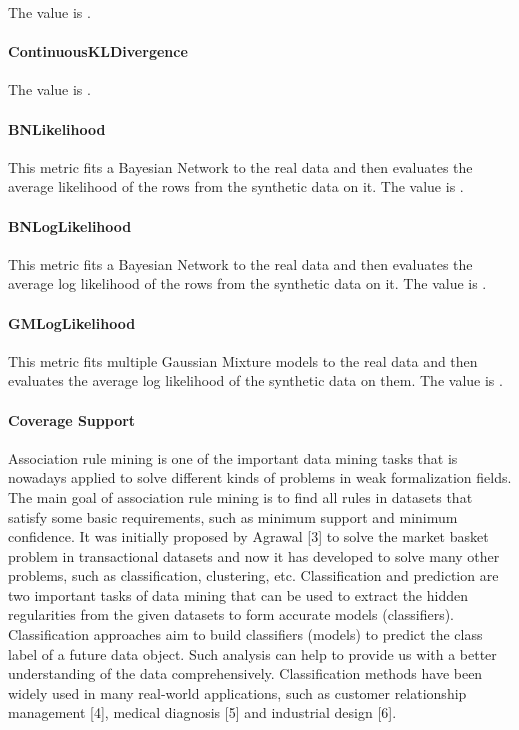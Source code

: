 \documentclass{article}
\begin{document}
The value is .\\

\paragraph{ContinuousKLDivergence}
The value is .\\


\paragraph{BNLikelihood}

This metric fits a Bayesian Network to the real data and then evaluates the average likelihood of the rows from the synthetic data on it. 
The value is .\\

\paragraph{BNLogLikelihood}

This metric fits a Bayesian Network to the real data and then evaluates the average log likelihood of the rows from the synthetic data on it.
The value is .\\


\paragraph{GMLogLikelihood}

This metric fits multiple Gaussian Mixture models to the real data and then evaluates the average log likelihood of the synthetic data on them.
The value is .\\

\paragraph{Coverage Support}
Association rule mining is one of the important data mining tasks that is nowadays applied to solve different kinds of problems in weak formalization fields. The main goal of association rule mining is to find all rules in datasets that satisfy some basic requirements, such as minimum support and minimum confidence. It was initially proposed by Agrawal [3] to solve the market basket problem in transactional datasets and now it has developed to solve many other problems, such as classification, clustering, etc. Classification and prediction are two important tasks of data mining that can be used to extract the hidden regularities from the given datasets to form accurate models (classifiers). Classification approaches aim to build classifiers (models) to predict the class label of a future data object. Such analysis can help to provide us with a better understanding of the data comprehensively. Classification methods have been widely used in many real-world applications, such as customer relationship management [4], medical diagnosis [5] and industrial design [6].
\end{document}
